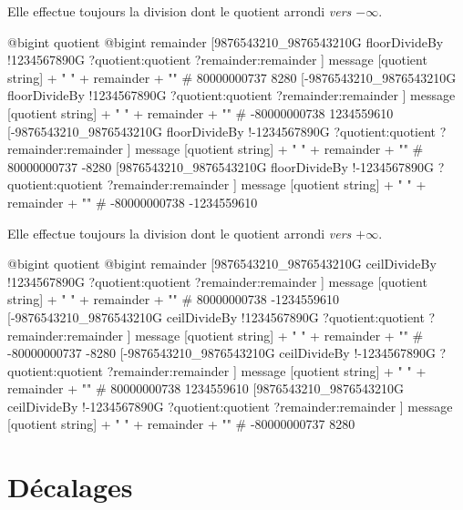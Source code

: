 Elle effectue toujours la division dont le quotient arrondi \emph{vers $-\infty$}.

\begin{galgas}
  @bigint quotient
  @bigint remainder
  [9876543210_9876543210G floorDivideBy
    !1234567890G
    ?quotient:quotient
    ?remainder:remainder
  ]
  message [quotient string] + " " + remainder + "\n" # 80000000737 8280
  [-9876543210_9876543210G floorDivideBy
    !1234567890G
    ?quotient:quotient
    ?remainder:remainder
  ]
  message [quotient string] + " " + remainder + "\n" # -80000000738 1234559610
  [-9876543210_9876543210G floorDivideBy
    !-1234567890G
    ?quotient:quotient
    ?remainder:remainder
  ]
  message [quotient string] + " " + remainder + "\n" # 80000000737 -8280
  [9876543210_9876543210G floorDivideBy
    !-1234567890G
    ?quotient:quotient
    ?remainder:remainder
  ]
  message [quotient string] + " " + remainder + "\n" # -80000000738 -1234559610
\end{galgas}





Elle effectue toujours la division dont le quotient arrondi \emph{vers $+\infty$}.

\begin{galgas}
  @bigint quotient
  @bigint remainder
  [9876543210_9876543210G ceilDivideBy
    !1234567890G
    ?quotient:quotient
    ?remainder:remainder
  ]
  message [quotient string] + " " + remainder + "\n" # 80000000738 -1234559610
  [-9876543210_9876543210G ceilDivideBy
    !1234567890G
    ?quotient:quotient
    ?remainder:remainder
  ]
  message [quotient string] + " " + remainder + "\n" # -80000000737 -8280
  [-9876543210_9876543210G ceilDivideBy
    !-1234567890G
    ?quotient:quotient
    ?remainder:remainder
  ]
  message [quotient string] + " " + remainder + "\n" # 80000000738 1234559610
  [9876543210_9876543210G ceilDivideBy
    !-1234567890G
    ?quotient:quotient
    ?remainder:remainder
  ]
  message [quotient string] + " " + remainder + "\n" # -80000000737 8280
\end{galgas}








\section{Décalages}

